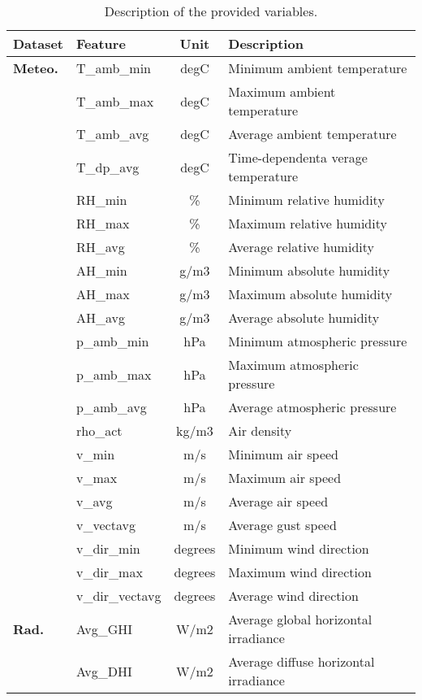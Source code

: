     \begin{longtable}{rlcl}
    \caption {Description of the provided variables.}
    \label{tab:available_variables}\\
    
    \toprule
    \multicolumn{1}{l}{\textbf{Dataset}} & \textbf{Feature} & \textbf{Unit} & \textbf{Description} \\
    \midrule
    \multicolumn{1}{l}{\textbf{Meteo.}} & T\_amb\_min & degC & Minimum ambient temperature \\
      & T\_amb\_max & degC & Maximum ambient temperature \\
      & T\_amb\_avg & degC & Average ambient temperature \\
      & T\_dp\_avg & degC & Time-dependenta verage temperature \\
      & RH\_min & \% & Minimum relative humidity \\
      & RH\_max & \% & Maximum relative humidity \\
      & RH\_avg & \% & Average relative humidity \\
      & AH\_min & g/m3 & Minimum absolute humidity \\
      & AH\_max & g/m3 & Maximum absolute humidity \\
      & AH\_avg & g/m3 & Average absolute humidity \\
      & p\_amb\_min & hPa & Minimum atmospheric pressure \\
      & p\_amb\_max & hPa & Maximum atmospheric pressure \\
      & p\_amb\_avg & hPa & Average atmospheric pressure \\
      & rho\_act & kg/m3 & Air density \\
      & v\_min & m/s & Minimum air speed \\
      & v\_max & m/s & Maximum air speed \\
      & v\_avg & m/s & Average air speed \\
      & v\_vectavg & m/s & Average gust speed \\
      & v\_dir\_min & degrees & Minimum wind direction \\
      & v\_dir\_max & degrees & Maximum wind direction \\
      & v\_dir\_vectavg & degrees & Average wind direction \\
    \midrule
    \multicolumn{1}{l}{\textbf{Rad.}} & Avg\_GHI & W/m2 & Average global horizontal irradiance \\
      & Avg\_DHI & W/m2 & Average diffuse horizontal irradiance \\

\end{longtable}

